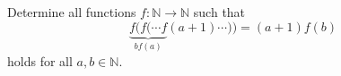 Determine all functions $f:\mathbb{N} \rightarrow \mathbb{N}$ such that
$$\underbrace{f(f(\cdots f}_{bf(a)}(a+1)\cdots)) = (a+1)f(b)$$    
holds for all $a,b \in \mathbb{N}$.
